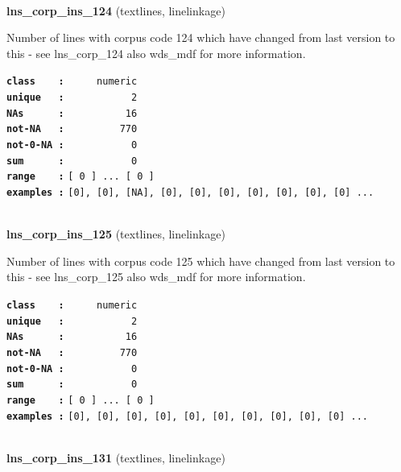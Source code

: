 \documentclass[]{article}
\begin{document}
~

\textbf{lns\_corp\_ins\_124} (textlines, linelinkage)

Number of lines with corpus code 124 which have changed from last
version to this - see lns\_corp\_124 also wds\_mdf for more information.

\textbf{\texttt{class\ \ \ \ :}} \texttt{~~~~~numeric}\\
\textbf{\texttt{unique\ \ \ :}} \texttt{~~~~~~~~~~~2}\\
\textbf{\texttt{NAs\ \ \ \ \ \ :}} \texttt{~~~~~~~~~~16}\\
\textbf{\texttt{not-NA\ \ \ :}} \texttt{~~~~~~~~~770}\\
\textbf{\texttt{not-0-NA\ :}} \texttt{~~~~~~~~~~~0}\\
\textbf{\texttt{sum\ \ \ \ \ \ :}} \texttt{~~~~~~~~~~~0}\\
\textbf{\texttt{range\ \ \ \ :}}
\texttt{{[}\ 0\ {]}\ ...\ {[}\ 0\ {]}}\\
\textbf{\texttt{examples\ :}}
\texttt{{[}0{]},\ {[}0{]},\ {[}NA{]},\ {[}0{]},\ {[}0{]},\ {[}0{]},\ {[}0{]},\ {[}0{]},\ {[}0{]},\ {[}0{]}\ ...}\\

~

\textbf{lns\_corp\_ins\_125} (textlines, linelinkage)

Number of lines with corpus code 125 which have changed from last
version to this - see lns\_corp\_125 also wds\_mdf for more information.

\textbf{\texttt{class\ \ \ \ :}} \texttt{~~~~~numeric}\\
\textbf{\texttt{unique\ \ \ :}} \texttt{~~~~~~~~~~~2}\\
\textbf{\texttt{NAs\ \ \ \ \ \ :}} \texttt{~~~~~~~~~~16}\\
\textbf{\texttt{not-NA\ \ \ :}} \texttt{~~~~~~~~~770}\\
\textbf{\texttt{not-0-NA\ :}} \texttt{~~~~~~~~~~~0}\\
\textbf{\texttt{sum\ \ \ \ \ \ :}} \texttt{~~~~~~~~~~~0}\\
\textbf{\texttt{range\ \ \ \ :}}
\texttt{{[}\ 0\ {]}\ ...\ {[}\ 0\ {]}}\\
\textbf{\texttt{examples\ :}}
\texttt{{[}0{]},\ {[}0{]},\ {[}0{]},\ {[}0{]},\ {[}0{]},\ {[}0{]},\ {[}0{]},\ {[}0{]},\ {[}0{]},\ {[}0{]}\ ...}\\

~

\textbf{lns\_corp\_ins\_131} (textlines, linelinkage)
\end{document}
